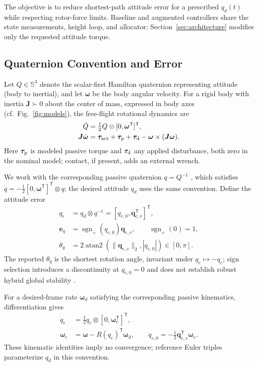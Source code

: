 \documentclass[letterpaper, 10 pt, conference]{ieeeconf}
\newcommand{\T}{^{\mathsf T}}
\newcommand{\sgnp}{\operatorname{sgn}_{+}}
\begin{document}
The objective is to reduce shortest-path attitude error for a prescribed
$q_d(t)$ while respecting rotor-force limits. Baseline and augmented
controllers share the state measurements, height loop, and allocator;
Section~\ref{sec:architecture} modifies only the requested attitude torque.

%

\subsection{Quaternion Convention and Error}
Let $Q\in\mathbb S^3$ denote the scalar-first Hamilton quaternion representing attitude (body to inertial), and let $\bm\omega$ be the body angular velocity. For a rigid body with inertia $\bm J\succ0$ about the center of mass, expressed in body axes (cf.~Fig.~\ref{fig:models}), the free-flight rotational dynamics are \cite{schaub2018amss}
\begin{align}
 \dot Q&=\tfrac12 Q\otimes[0,\bm\omega\T]\T,\\
 \bm J\dot{\bm\omega}&=\bm\tau_{\rm act}+\bm\tau_{\rm p}
       +\bm\tau_{\rm d}-\bm\omega\times(\bm J\bm\omega).
 \label{eq:plant}
\end{align}
Here $\bm\tau_{\rm p}$ is modeled passive torque and $\bm\tau_{\rm d}$ any applied disturbance, both zero in the nominal model; contact, if present, adds an external wrench.

We work with the corresponding passive quaternion $q=Q^{-1}$ \cite{diebel2006quaternion}, which satisfies $\dot q=-\tfrac12[0,\bm\omega\T]\T\otimes q$; the desired attitude $q_d$ uses the same convention. Define the attitude error
\begin{align}
 q_e&=q_d\otimes q^{-1}=[q_{e,0},\bm q_{e,v}\T]\T,\\
 \bm e_q&=\sgnp(q_{e,0})\bm q_{e,v},\qquad \sgnp(0)=1,\\
 \theta_q&=2\operatorname{atan2}(\|\bm q_{e,v}\|_2,|q_{e,0}|)
             \in[0,\pi].
 \label{eq:theta}
\end{align}
The reported $\theta_q$ is the shortest rotation angle, invariant under $q_e\mapsto-q_e$; sign selection introduces a discontinuity at $q_{e,0}=0$ and does not establish robust hybrid global stability \cite{mayhew2011hybrid}.

For a desired-frame rate $\bm\omega_d$ satisfying the corresponding passive kinematics, differentiation gives
\begin{align}
 \dot q_e&=\tfrac12q_e\otimes[0,\bm\omega_e\T]\T,\\
 \bm\omega_e&=\bm\omega-R(q_e)\T\bm\omega_d,\qquad
 \dot q_{e,0}=-\tfrac12\bm q_{e,v}\T\bm\omega_e.
 \label{eq:errkin}
\end{align}
These kinematic identities imply no convergence; reference Euler triples parameterize $q_d$ in this convention.
\end{document}

